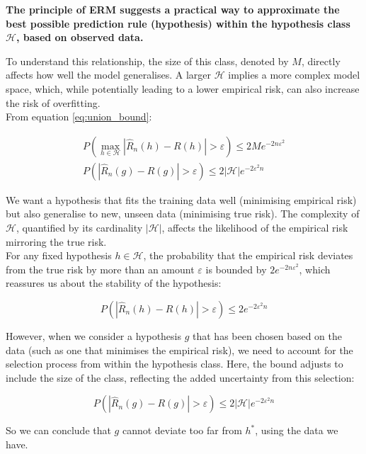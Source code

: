 \textbf{The principle of ERM suggests a practical way to approximate the best possible prediction rule (hypothesis) within the hypothesis class $\mathcal{H}$, based on observed data. \\}

To understand this relationship, the size of this class, denoted by \( M \), directly affects how well the model generalises. A larger \( \mathcal{H} \) implies a more complex model space, which, while potentially leading to a lower empirical risk, can also increase the risk of overfitting. \\

From equation \ref{eq:union_bound}:

\begin{align}
P\left( \max_{h \in \mathcal{H}} |\widehat{R}_n(h) - R(h)| > \varepsilon \right) \leq 2Me^{-2n\varepsilon^2} \label{eq:extension_hoeff_M} \\
P\left(|\widehat{R}_n(g)-R(g)|>\varepsilon\right)\leq 2|\mathcal{H}|e^{-2\varepsilon^2n}
\end{align}


We want a hypothesis that fits the training data well (minimising empirical risk) but also generalise to new, unseen data (minimising true risk).
The complexity of $\mathcal{H}$, quantified by its cardinality \( |\mathcal{H}| \), affects the likelihood of the empirical risk mirroring the true risk.\\


For any fixed hypothesis \( h \in \mathcal{H} \), the probability that the empirical risk deviates from the true risk by more than an amount \( \varepsilon \) is bounded by \( 2e^{-2n\varepsilon^2} \), which reassures us about the stability of the hypothesis:

\[
P\left(|\widehat{R}_n(h)-R(h)|>\varepsilon\right)\leqslant2e^{-2\varepsilon^2n}
\]

However, when we consider a hypothesis \( g \) that has been chosen based on the data (such as one that minimises the empirical risk), we need to account for the selection process from within the hypothesis class. Here, the bound adjusts to include the size of the class, reflecting the added uncertainty from this selection:

\[
P\left(|\widehat{R}_n(g)-R(g)|>\varepsilon\right)\leqslant2|\mathcal{H}|e^{-2\varepsilon^2n}
\]

So we can conclude that $g$ cannot deviate too far from $h^*$, using the data we have.


